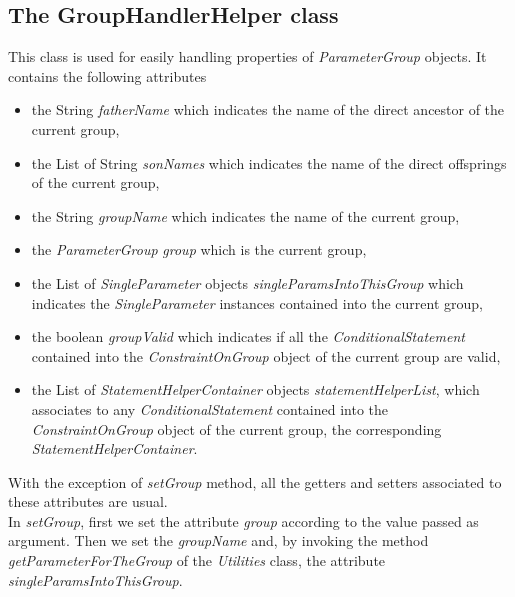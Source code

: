 \documentclass[a4paper,11pt] {ivoa}
\begin{document}
\subsection{The GroupHandlerHelper class}\label{GroupHandlerHelper}
This class is used for easily handling properties of {\it ParameterGroup} objects. It contains the following attributes
\begin{itemize}
\item the String {\it fatherName} which indicates the name of the direct ancestor of the current group,
\item the List of String {\it sonNames} which indicates the name of the direct offsprings of the current group,
\item the String {\it groupName} which indicates the name of the current group,
\item the {\it ParameterGroup} {\it group} which is the current group,
\item the List of {\it SingleParameter} objects {\it singleParamsIntoThisGroup} which indicates the {\it SingleParameter} instances contained into the current group, 
\item the boolean {\it groupValid} which indicates if all the {\it ConditionalStatement} contained into the {\it ConstraintOnGroup} object of the current group are valid,
\item the List of {\it StatementHelperContainer} objects {\it statementHelperList}, which associates to any {\it ConditionalStatement} contained into the {\it ConstraintOnGroup} object of the current group, the corresponding  {\it StatementHelperContainer}.
\end{itemize}
With the exception of {\it setGroup} method, all the getters and setters associated to these attributes are usual.\\ 
In {\it setGroup}, first we set the attribute {\it group} according to the value passed as argument. Then we set  the {\it groupName} and, by invoking the method {\it getParameterForTheGroup} of  the {\it Utilities} class, the attribute {\it singleParamsIntoThisGroup}.
\end{document}
